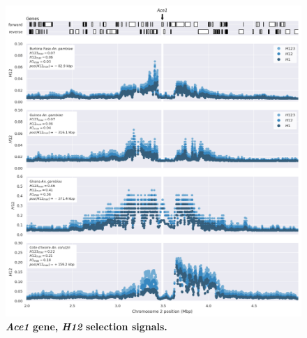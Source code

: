 \documentclass[a4paper,11pt,abstracton,hidelinks]{scrartcl}
\begin{document}
\begin{figure}[t!]
	\begin{center}
		\includegraphics*[width=1.1\linewidth,center]{artwork/locus_ace1_h12.png}
	\end{center}
	\caption[\textit{Ace1} gene, \textit{H12} selection signals]{
	\textbf{\textit{Ace1} gene, \textit{H12} selection signals.}
	} 
	\label{fig:locus_ace1_h12}
\end{figure}


\clearpage
\end{document}
